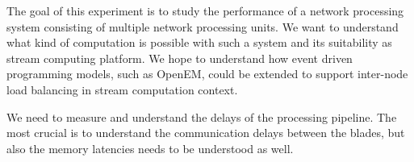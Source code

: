 The goal of this experiment is to study the performance of a network processing system consisting of multiple network processing units. We want to understand what kind of computation is possible with such a system and its suitability as stream computing platform. We hope to understand how event driven programming models, such as OpenEM, could be extended to support inter-node load balancing in stream computation context.

We need to measure and understand the delays of the processing pipeline. The most crucial is to understand the communication delays between the blades, but also the memory latencies needs to be understood as well.

